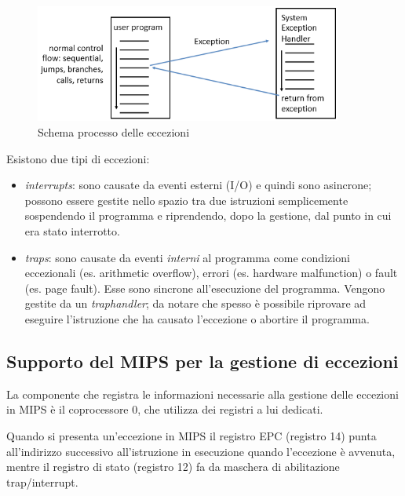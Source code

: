 \documentclass[class=book, crop=false, oneside]{standalone}
\begin{document}
\begin{figure}[H]
	\centering
	\includegraphics[width=0.9\textwidth,keepaspectratio]{schema-eccezioni}
	\caption{Schema processo delle eccezioni}
\end{figure}
Esistono due tipi di eccezioni:
\begin{itemize}
	\item \emph{interrupts}: sono causate da eventi esterni (I/O) e quindi sono asincrone; possono essere gestite nello spazio tra due istruzioni semplicemente sospendendo il programma e riprendendo, dopo la gestione, dal punto in cui era stato interrotto.
	\item \emph{traps}: sono causate da eventi \emph{interni} al programma come condizioni eccezionali (es. arithmetic overflow), errori (es. hardware malfunction) o fault (es. page fault). Esse sono sincrone all'esecuzione del programma. Vengono gestite da un \emph{traphandler}; da notare che spesso è possibile riprovare ad eseguire l'istruzione che ha causato l'eccezione o abortire il programma.
\end{itemize}

\subsection{Supporto del MIPS per la gestione di eccezioni}
La componente che registra le informazioni necessarie alla gestione delle eccezioni in MIPS è il coprocessore 0, che utilizza dei registri a lui dedicati.

Quando si presenta un'eccezione in MIPS il registro EPC (registro 14) punta all'indirizzo successivo all'istruzione in esecuzione quando l'eccezione è avvenuta, mentre il registro di stato (registro 12) fa da maschera di abilitazione trap/interrupt.
\end{document}
